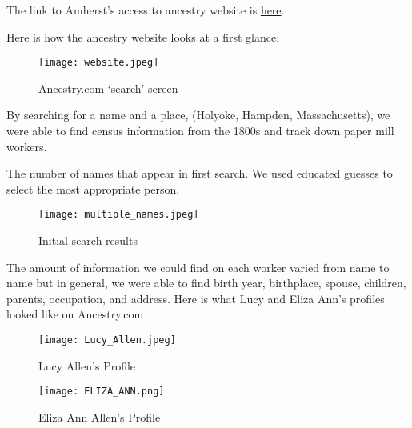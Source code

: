 \documentclass[
  letterpaper,
  DIV=11,
  numbers=noendperiod]{scrartcl}
\begin{document}
The link to Amherst's access to ancestry website is
\href{https://libguides.amherst.edu/c.php?g=944984\&p=6812570}{here}.

Here is how the ancestry website looks at a first glance:

\begin{figure}

{\centering \texttt{[image: website.jpeg]}

}

\caption{\label{fig-sample2}Ancestry.com `search' screen}

\end{figure}

By searching for a name and a place, (Holyoke, Hampden, Massachusetts),
we were able to find census information from the 1800s and track down
paper mill workers.

The number of names that appear in first search. We used educated
guesses to select the most appropriate person.

\begin{figure}

{\centering \texttt{[image: multiple\_names.jpeg]}

}

\caption{\label{fig-sample3}Initial search results}

\end{figure}

The amount of information we could find on each worker varied from name
to name but in general, we were able to find birth year, birthplace,
spouse, children, parents, occupation, and address. Here is what Lucy
and Eliza Ann's profiles looked like on Ancestry.com

\begin{figure}

{\centering \texttt{[image: Lucy\_Allen.jpeg]}

}

\caption{\label{fig-sample5}Lucy Allen's Profile}

\end{figure}

\begin{figure}

{\centering \texttt{[image: ELIZA\_ANN.png]}

}

\caption{\label{fig-sample6}Eliza Ann Allen's Profile}

\end{figure}
\end{document}
